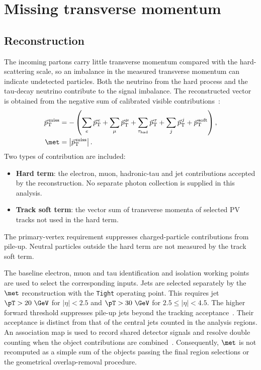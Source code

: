 \section{Missing transverse momentum}
\label{sec:ch6_met}

\subsection{Reconstruction}

The incoming partons carry little transverse momentum compared with the hard-scattering scale, so an imbalance in the measured transverse momentum can indicate undetected particles.
Both the neutrino from the hard process and the tau-decay neutrino contribute to the signal imbalance.
The reconstructed vector is obtained from the negative sum of calibrated visible contributions~\cite{ATLAS2025METPerformance}:
\begin{align}
    \vec p_{\mathrm{T}}^{\,\mathrm{miss}}
    &=-\left(
    \sum_e\vec p_{\mathrm{T}}^{\,e}
    +\sum_\mu\vec p_{\mathrm{T}}^{\,\mu}
    +\sum_{\tau_{\mathrm{had}}}\vec p_{\mathrm{T}}^{\,\tau}
    +\sum_j\vec p_{\mathrm{T}}^{\,j}
    +\vec p_{\mathrm{T}}^{\,\mathrm{soft}}
    \right),
    \label{eq:ch6_met_vector}\\
    \met&=\left|\vec p_{\mathrm{T}}^{\,\mathrm{miss}}\right|.
    \label{eq:ch6_met_magnitude}
\end{align}
Two types of contribution are included:
\begin{itemize}
    \item \textbf{Hard term}: the electron, muon, hadronic-tau and jet contributions accepted by the reconstruction. No separate photon collection is supplied in this analysis.
    \item \textbf{Track soft term}: the vector sum of transverse momenta of selected PV tracks not used in the hard term.
\end{itemize}
The primary-vertex requirement suppresses charged-particle contributions from pile-up.
Neutral particles outside the hard term are not measured by the track soft term.

The baseline electron, muon and tau identification and isolation working points are used to select the corresponding inputs.
Jets are selected separately by the $\met$ reconstruction with the \texttt{Tight} operating point.
This requires jet $\pT>20~\GeV$ for $|\eta|<2.5$ and $\pT>30~\GeV$ for $2.5\leq|\eta|<4.5$.
The higher forward threshold suppresses pile-up jets beyond the tracking acceptance~\cite{ATLAS2025METPerformance}.
Their acceptance is distinct from that of the central jets counted in the analysis regions.
An association map is used to record shared detector signals and resolve double counting when the object contributions are combined~\cite{ATLAS2025METPerformance}.
Consequently, $\met$ is not recomputed as a simple sum of the objects passing the final region selections or the geometrical overlap-removal procedure.

